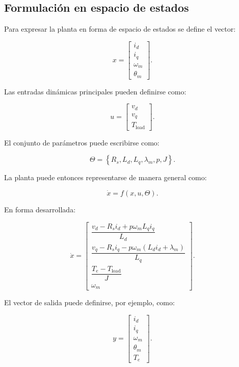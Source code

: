 \subsection{Formulación en espacio de estados}

Para expresar la planta en forma de espacio de estados se define el vector:

\begin{equation}
x=
\begin{bmatrix}
i_d\\
i_q\\
\omega_m\\
\theta_m
\end{bmatrix}.
\end{equation}

Las entradas dinámicas principales pueden definirse como:

\begin{equation}
u=
\begin{bmatrix}
v_d\\
v_q\\
T_{\mathrm{load}}
\end{bmatrix}.
\end{equation}

El conjunto de parámetros puede escribirse como:

\begin{equation}
\Theta=
\left\{
R_s,L_d,L_q,\lambda_m,p,J
\right\}.
\end{equation}

La planta puede entonces representarse de manera general como:

\begin{equation}
\dot{x}=f(x,u,\Theta).
\end{equation}

En forma desarrollada:

\begin{equation}
\dot{x}
=
\begin{bmatrix}
\dfrac{
v_d-R_si_d+p\omega_mL_qi_q
}{L_d}
\\[10pt]
\dfrac{
v_q-R_si_q-p\omega_m(L_di_d+\lambda_m)
}{L_q}
\\[10pt]
\dfrac{
T_e-T_{\mathrm{load}}
}{J}
\\[10pt]
\omega_m
\end{bmatrix}.
\end{equation}

El vector de salida puede definirse, por ejemplo, como:

\begin{equation}
y=
\begin{bmatrix}
i_d\\
i_q\\
\omega_m\\
\theta_m\\
T_e
\end{bmatrix}.
\end{equation}

